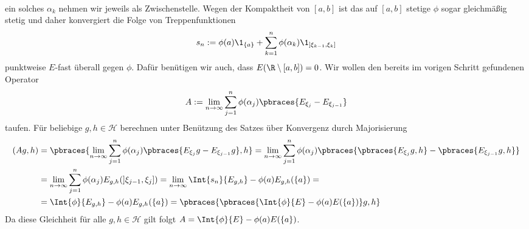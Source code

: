 \begin{solution}
\begin{align*}
\end{align*}
ein solches $\alpha_k$ nehmen wir jeweils als Zwischenstelle. Wegen der Kompaktheit von $[a, b]$ ist das auf $[a, b]$ stetige $\phi$ sogar gleichmäßig stetig und daher konvergiert die Folge von Treppenfunktionen
\begin{align*}
  s_n := \phi(a) \1_{\{a\}} + \sum_{k = 1}^n \phi(\alpha_k) \1_{]\xi_{k-1}, \xi_k]}
\end{align*}
punktweise $E$-fast überall gegen $\phi$. Dafür benütigen wir auch, dass $E(\R \setminus [a, b]) = 0$. Wir wollen den bereits im vorigen Schritt gefundenen Operator
\begin{align*}
  A := \lim_{n \to \infty} \sum_{j = 1}^n \phi(\alpha_j) \pbraces{E_{\xi_j} - E_{\xi_{j - 1}}}
\end{align*}
taufen. Für beliebige $g, h \in \mathcal{H}$ berechnen unter Benützung des Satzes über Konvergenz durch Majorisierung
\begin{align*}
  (Ag, h) &= \pbraces{\lim_{n \to \infty} \sum_{j = 1}^n \phi(\alpha_j) \pbraces{E_{\xi_j}g - E_{\xi_{j - 1}}g}, h} = \lim_{n \to \infty} \sum_{j = 1}^n \phi(\alpha_j) \pbraces{\pbraces{E_{\xi_j}g, h} - \pbraces{E_{\xi_{j - 1}}g, h}} \\
  & = \lim_{n \to \infty} \sum_{j = 1}^n \phi(\alpha_j) E_{g, h}(]\xi_{j - 1}, \xi_j]) = \lim_{n \to \infty} \Int{s_n}{E_{g,h}} - \phi(a) E_{g, h}(\{a\}) = \\
  &= \Int{\phi}{E_{g, h}} - \phi(a) E_{g, h}(\{a\}) = \pbraces{\pbraces{\Int{\phi}{E} - \phi(a)E(\{a\})}g, h}
\end{align*}
Da diese Gleichheit für alle $g, h \in \mathcal{H}$ gilt folgt $A = \Int{\phi}{E} - \phi(a)E(\{a\})$.
\end{solution}
